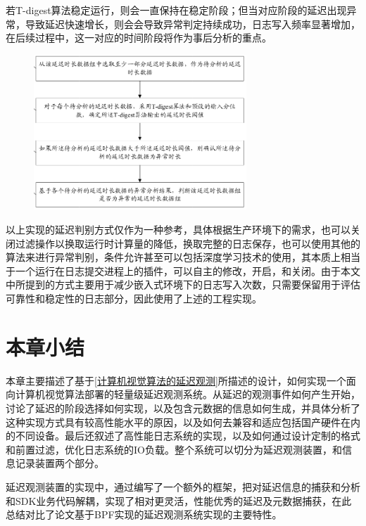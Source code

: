 \documentclass[master]{shtthesis}
\begin{document}
若T-digest算法稳定运行，则会一直保持在稳定阶段；但当对应阶段的延迟出现异常，导致延迟快速增长，则会会导致异常判定持续成功，日志写入频率显著增加，在后续过程中，这一对应的时间阶段将作为事后分析的重点。
\begin{figure}[htbp]
	\centering
	\includegraphics[width=8cm]{img/z2.png}
	\label{延迟前置过滤}
\end{figure}

以上实现的延迟判别方式仅作为一种参考，具体根据生产环境下的需求，也可以关闭过滤操作以换取运行时计算量的降低，换取完整的日志保存，也可以使用其他的算法来进行异常判别，条件允许甚至可以包括深度学习技术的使用，其本质上相当于一个运行在日志提交进程上的插件，可以自主的修改，开启，和关闭。由于本文中所提到的方式主要用于减少嵌入式环境下的日志写入次数，只需要保留用于评估可靠性和稳定性的日志部分，因此使用了上述的工程实现。

\section{本章小结}
本章主要描述了基于\ref{计算机视觉算法的延迟观测}所描述的设计，如何实现一个面向计算机视觉算法部署的轻量级延迟观测系统。从延迟的观测事件如何产生开始，讨论了延迟的阶段选择如何实现，以及包含元数据的信息如何生成，并具体分析了这种实现方式具有较高性能水平的原因，以及如何去兼容和适应包括国产硬件在内的不同设备。最后还叙述了高性能日志系统的实现，以及如何通过设计定制的格式和前置过滤，优化日志系统的IO负载。整个系统可以切分为延迟观测装置，和信息记录装置两个部分。

延迟观测装置的实现中，通过编写了一个额外的框架，把对延迟信息的捕获和分析和SDK业务代码解耦，实现了相对更灵活，性能优秀的延迟及元数据捕获，在此总结对比了论文基于BPF实现的延迟观测系统实现的主要特性。
\end{document}
